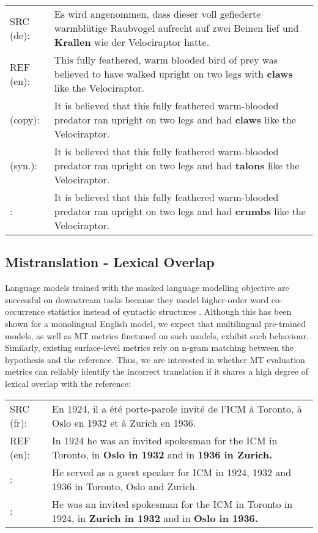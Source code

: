 \documentclass[11pt]{article}
\newcommand{\cmark}{\textcolor{darkpastelgreen}{\ding{51}}}\newcommand{\xmark}{\textcolor{darkpastelred}{\ding{55}}}
\begin{document}
\begin{small}
\vspace{0.5cm}
\setlength{\extrarowheight}{0.1cm}
\begin{tabularx}{0.95\columnwidth}{lX}
     SRC (de): & Es wird angenommen, dass dieser voll gefiederte warmblütige Raubvogel aufrecht auf zwei Beinen lief und \textbf{Krallen} wie der Velociraptor hatte. \\
     REF (en): & This fully feathered, warm blooded bird of prey was believed to have walked upright on two legs with \textbf{claws} like the Velociraptor.\\
     \cmark{} (copy): & It is believed that this fully feathered warm-blooded predator ran upright on two legs and had \textbf{claws} like the Velociraptor.\\
     \cmark{} (syn.): & It is believed that this fully feathered warm-blooded predator ran upright on two legs and had \textbf{talons} like the Velociraptor.\\
     \xmark: & It is believed that this fully feathered warm-blooded predator ran upright on two legs and had \textbf{crumbs} like the Velociraptor. \vspace{0.35cm}
\end{tabularx}
\end{small}


\subsection{Mistranslation - Lexical Overlap}
\label{subsec:lexical-overlap}
Language models trained with the masked language modelling objective are successful on downstream tasks because they model higher-order word co-occurrence statistics instead of syntactic structures \citep{sinha-etal-2021-masked}. Although this has been shown for a monolingual English model, we expect that multilingual pre-trained models, as well as MT metrics finetuned on such models, exhibit such behaviour. Similarly, existing surface-level metrics rely on n-gram matching between the hypothesis and the reference. Thus, we are interested in whether MT evaluation metrics can reliably identify the incorrect translation if it shares a high degree of lexical overlap with the reference:

\begin{small}
\vspace{0.5cm}
\setlength{\extrarowheight}{0.1cm}
\begin{tabularx}{0.95\columnwidth}{lX}
     SRC (fr): & En 1924, il a été porte-parole invité de l'ICM à Toronto, à Oslo en 1932 et à Zurich en 1936. \\
     REF (en): & In 1924 he was an invited spokesman for the ICM in Toronto, in \textbf{Oslo in 1932} and in \textbf{1936 in Zurich.}\\
     \cmark: & He served as a guest speaker for ICM in 1924, 1932 and 1936 in Toronto, Oslo and Zurich.\\
     \xmark: & He was an invited spokesman for the ICM in Toronto in 1924, in \textbf{Zurich in 1932} and in \textbf{Oslo in 1936.} \vspace{0.35cm}
\end{tabularx}
\end{small}
\end{document}
